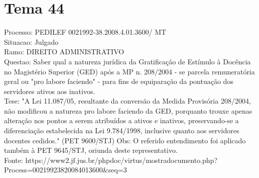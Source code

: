 \documentclass[12pt]{article}
\begin{document}
\section*{Tema 44}
Processo: PEDILEF 0021992-38.2008.4.01.3600/ MT\\
Situacao: Julgado\\
Ramo: DIREITO ADMINISTRATIVO\\
Questao: Saber qual a natureza jurídica da Gratificação de Estímulo à Docência no Magistério Superior (GED) após a MP n. 208/2004 - se parcela remuneratória geral ou "pro labore faciendo" - para fins de equiparação da pontuação dos servidores ativos aos inativos.\\
Tese: "A Lei 11.087/05, resultante da conversão da Medida Provisória 208/2004, não modificou a natureza pro labore faciendo da GED, porquanto trouxe apenas alteração nos pontos a serem atribuídos a ativos e inativos, preservando-se a diferenciação estabelecida na Lei 9.784/1998, inclusive quanto aos servidores docentes cedidos." (PET 9600/STJ) Obs: O referido entendimento foi aplicado também à PET 9645/STJ, oriunda deste representativo.\\
Fonte: https://www2.jf.jus.br/phpdoc/virtus/mostradocumento.php?Process=00219923820084013600\&seq=3
\end{document}
